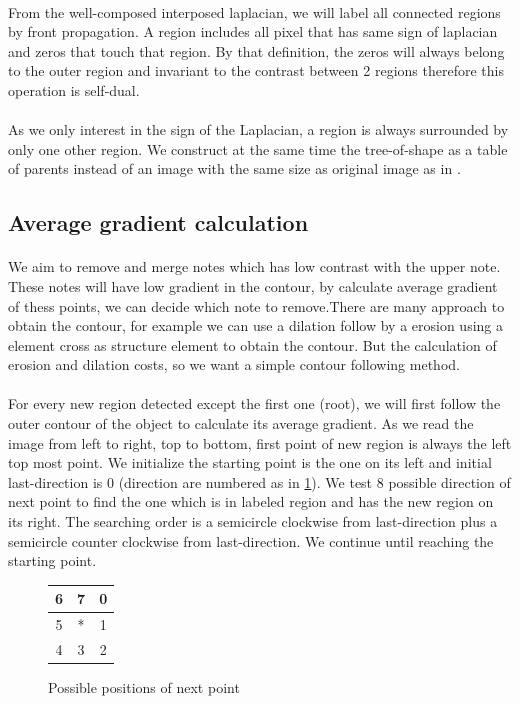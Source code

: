 \documentclass[12pt,a4paper]{report}
\begin{document}
\paragraph{} From the well-composed interposed laplacian, we will label all connected regions by front propagation. A region includes all pixel that has same sign of laplacian and zeros that touch that region. By that definition, the zeros will always belong to the outer region and invariant to the contrast between 2 regions therefore this operation is self-dual. 
\paragraph{}As we only interest in the sign of the Laplacian, a region is always surrounded by only one other region. We construct at the same time the tree-of-shape as a table of parents instead of an image with the same size as original image as in \cite{geraud.13.ismm}. 

\subsection{Average gradient calculation}
\paragraph{} We aim to remove and merge notes which has low contrast with the upper note. These notes will have low gradient in the contour, by calculate average gradient of thess points, we can decide which note to remove.There are many approach to obtain the contour, for example we can use a dilation follow by a erosion using a element cross as structure element to obtain the contour. But the calculation of erosion and dilation costs, so we want a simple contour following method. 
\paragraph{} For every new region detected except the first one (root), we will first follow the outer contour of the object to calculate its average gradient. As we read the image from left to right, top to bottom, first point of new region is always the left top most point. We initialize the starting point is the one on its left and initial last-direction is 0 (direction are numbered as in \ref{directionToSearch}). We test 8 possible direction of next point to find the one which is in labeled region and has the new region on its right. The searching order is a semicircle clockwise from last-direction plus a semicircle counter clockwise from last-direction. We continue until reaching the starting point. 
\begin{figure}
\begin{tabular}{|c|c|c|}
\hline 
6 & 7 & 0 \\ 
\hline 
5 & * & 1 \\ 
\hline 
4 & 3 & 2 \\ 
\hline 
\end{tabular}  
\centering
\caption{Possible positions of next point}
\label{directionToSearch}
\end{figure}
\end{document}
